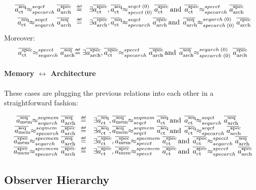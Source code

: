 \documentclass[12pt]{article}
\begin{document}
\[
  \begin{array}{rcl}
    \seqctTrace\seqctTOspecarchtr\specarchTrace &\isdef& \exists \specctTrace\;,
        \seqctTrace\seqctTOspeccttr{0}{0}\specctTrace
      \;\operatorname{and}\;
        \specctTrace\specctTOspecarchtr\specarchTrace
    \\[1ex]
    \seqctTrace\seqctTOseqarchtr\seqarchTrace &\isdef& \exists \specarchTrace\;,
        \seqctTrace\seqctTOspecarchtr\specarchTrace
      \;\operatorname{and}\;
        \seqarchTrace\seqarchTOspecarchtr{0}{0}\specarchTrace
  \end{array}
\]
Moreover:
\[
  \specctTrace\specctTOseqarchtr\seqarchTrace \isdef 
    \exists \specarchTrace\;,
      \specctTrace\specctTOspecarchtr\specarchTrace
    \;\operatorname{and}\;
      \seqarchTrace\seqarchTOspecarchtr{0}{0}\specarchTrace
\]

\paragraph{Memory $\leftrightarrow$ Architecture} $\;$\\
These cases are plugging the previous relations into each other in a straightforward fashion:

\[
  \begin{array}{rcl}
    \seqmemTrace\seqmemTOseqarchtr\seqarchTrace &\isdef&
      \exists \seqctTrace\;,
        \seqmemTrace\seqmemTOseqcttr\seqctTrace
      \;\operatorname{and}\;
        \seqctTrace\seqctTOseqarchtr\seqarchTrace
    \\
    \seqmemTrace\seqmemTOspecarchtr\specarchTrace &\isdef&
      \exists \seqctTrace\;,
        \seqmemTrace\seqmemTOseqcttr\seqctTrace
      \;\operatorname{and}\;
        \seqctTrace\seqctTOspecarchtr\specarchTrace
    \\
    \specmemTrace\specmemTOseqarchtr\seqarchTrace &\isdef&
      \exists \specctTrace\;,
        \specmemTrace\specmemTOspeccttr\specctTrace
      \;\operatorname{and}\;
        \specctTrace\specctTOseqarchtr\seqarchTrace
    \\
    \specmemTrace\specmemTOspecarchtr\specarchTrace &\isdef&
      \exists \specctTrace\;,
        \specmemTrace\specmemTOspeccttr\specctTrace
      \;\operatorname{and}\;
        \specctTrace\specctTOspecarchtr\specarchTrace
    \\
  \end{array}
\]

\subsection{Observer Hierarchy}
\end{document}
